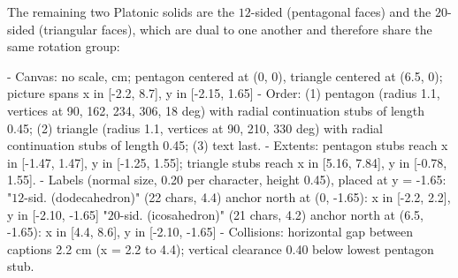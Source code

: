 \begin{content}
The remaining two Platonic solids are the $12$-sided  (pentagonal faces) and the $20$-sided  (triangular faces), which are dual to one another and therefore share the same rotation group:

\begin{hidden}
- Canvas: no scale, cm; pentagon centered at (0, 0), triangle centered at (6.5, 0); picture spans x in [-2.2, 8.7], y in [-2.15, 1.65]
- Order: (1) pentagon (radius 1.1, vertices at 90, 162, 234, 306, 18 deg) with radial continuation stubs of length 0.45;
  (2) triangle (radius 1.1, vertices at 90, 210, 330 deg) with radial continuation stubs of length 0.45; (3) text last.
- Extents: pentagon stubs reach x in [-1.47, 1.47], y in [-1.25, 1.55]; triangle stubs reach x in [5.16, 7.84], y in [-0.78, 1.55].
- Labels (normal size, 0.20 per character, height 0.45), placed at y = -1.65:
  "$12$-sid. (dodecahedron)" (22 chars, 4.4) anchor north at (0, -1.65): x in [-2.2, 2.2], y in [-2.10, -1.65]
  "$20$-sid. (icosahedron)" (21 chars, 4.2) anchor north at (6.5, -1.65): x in [4.4, 8.6], y in [-2.10, -1.65]
- Collisions: horizontal gap between captions 2.2 cm (x = 2.2 to 4.4); vertical clearance 0.40 below lowest pentagon stub.
\end{hidden}
\begin{center}
\end{center}


\end{content}
